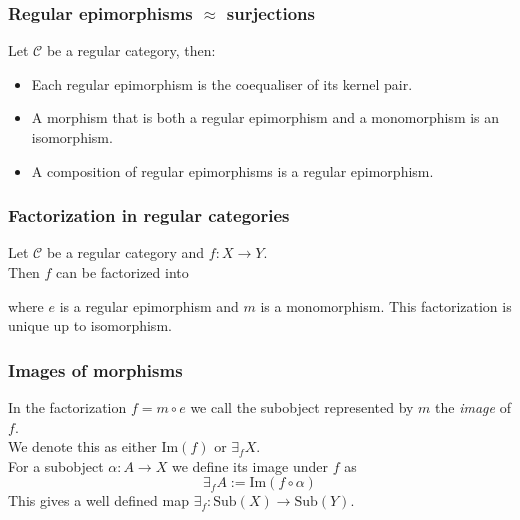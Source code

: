 \documentclass[14pt]{beamer}
\theoremstyle{plain}
\begin{document}
  \begin{frame}
    \frametitle{Regular epimorphisms $\approx$ surjections}
      Let $\mathcal{C}$ be a regular category, then:
      \begin{itemize}
        \item<2-> Each regular epimorphism is the coequaliser of its kernel pair.
        \item<3-> A morphism that is both a regular epimorphism and a monomorphism is an
          isomorphism.
        \item<4-> A composition of regular epimorphisms is a regular epimorphism.
      \end{itemize}
  \end{frame}

  \begin{frame}[fragile]
    \frametitle{Factorization in regular categories}
    Let $\mathcal{C}$ be a regular category and $f : X \to Y$.
    \pause \\
    Then $f$ can be factorized into
    \begin{center}
    \end{center}
    where $e$ is a regular epimorphism and $m$ is a monomorphism.
    \pause
    This factorization is unique up to isomorphism.
  \end{frame}

  \begin{frame}
    \frametitle{Images of morphisms}
    In the factorization $f = m \circ e$ we call the subobject represented by $m$
    the \emph{image} of $f$.
    \pause \\
    \vspace*{1em}
    We denote this as either $\mathrm{Im}(f)$ or $\exists_f X$.
    \pause \\
    \vspace*{1em}
    For a subobject $\alpha : A \to X$ we define its image under $f$ as
    \[ \exists_f A := \mathrm{Im}(f \circ \alpha) \]
    This gives a well defined map $\exists_f : \mathrm{Sub}(X) \to \mathrm{Sub}(Y)$.
  \end{frame}
  
\end{document}
